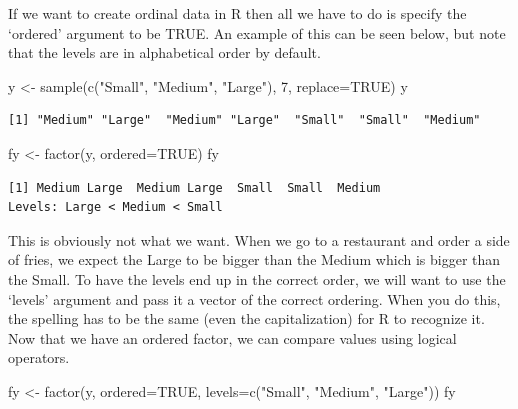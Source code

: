 \documentclass[
  letterpaper,
  DIV=11,
  numbers=noendperiod]{scrreprt}
\newenvironment{Shaded}{\begin{snugshade}}{\end{snugshade}}
\newcommand{\AttributeTok}[1]{\textcolor[rgb]{0.40,0.45,0.13}{#1}}
\newcommand{\ConstantTok}[1]{\textcolor[rgb]{0.56,0.35,0.01}{#1}}
\newcommand{\DecValTok}[1]{\textcolor[rgb]{0.68,0.00,0.00}{#1}}
\newcommand{\FunctionTok}[1]{\textcolor[rgb]{0.28,0.35,0.67}{#1}}
\newcommand{\NormalTok}[1]{\textcolor[rgb]{0.00,0.23,0.31}{#1}}
\newcommand{\OtherTok}[1]{\textcolor[rgb]{0.00,0.23,0.31}{#1}}
\newcommand{\StringTok}[1]{\textcolor[rgb]{0.13,0.47,0.30}{#1}}
\begin{document}
If we want to create ordinal data in R then all we have to do is specify
the `ordered' argument to be TRUE. An example of this can be seen below,
but note that the levels are in alphabetical order by default.

\begin{Shaded}
\begin{Highlighting}[]
\NormalTok{y }\OtherTok{\textless{}{-}} \FunctionTok{sample}\NormalTok{(}\FunctionTok{c}\NormalTok{(}\StringTok{"Small"}\NormalTok{, }\StringTok{"Medium"}\NormalTok{, }\StringTok{"Large"}\NormalTok{), }\DecValTok{7}\NormalTok{, }\AttributeTok{replace=}\ConstantTok{TRUE}\NormalTok{)}
\NormalTok{y}
\end{Highlighting}
\end{Shaded}

\begin{verbatim}
[1] "Medium" "Large"  "Medium" "Large"  "Small"  "Small"  "Medium"
\end{verbatim}

\begin{Shaded}
\begin{Highlighting}[]
\NormalTok{fy }\OtherTok{\textless{}{-}} \FunctionTok{factor}\NormalTok{(y, }\AttributeTok{ordered=}\ConstantTok{TRUE}\NormalTok{)}
\NormalTok{fy}
\end{Highlighting}
\end{Shaded}

\begin{verbatim}
[1] Medium Large  Medium Large  Small  Small  Medium
Levels: Large < Medium < Small
\end{verbatim}

This is obviously not what we want. When we go to a restaurant and order
a side of fries, we expect the Large to be bigger than the Medium which
is bigger than the Small. To have the levels end up in the correct
order, we will want to use the `levels' argument and pass it a vector of
the correct ordering. When you do this, the spelling has to be the same
(even the capitalization) for R to recognize it. Now that we have an
ordered factor, we can compare values using logical operators.

\begin{Shaded}
\begin{Highlighting}[]
\NormalTok{fy }\OtherTok{\textless{}{-}} \FunctionTok{factor}\NormalTok{(y, }\AttributeTok{ordered=}\ConstantTok{TRUE}\NormalTok{, }\AttributeTok{levels=}\FunctionTok{c}\NormalTok{(}\StringTok{"Small"}\NormalTok{, }\StringTok{"Medium"}\NormalTok{, }\StringTok{"Large"}\NormalTok{))}
\NormalTok{fy}
\end{Highlighting}
\end{Shaded}
\end{document}
